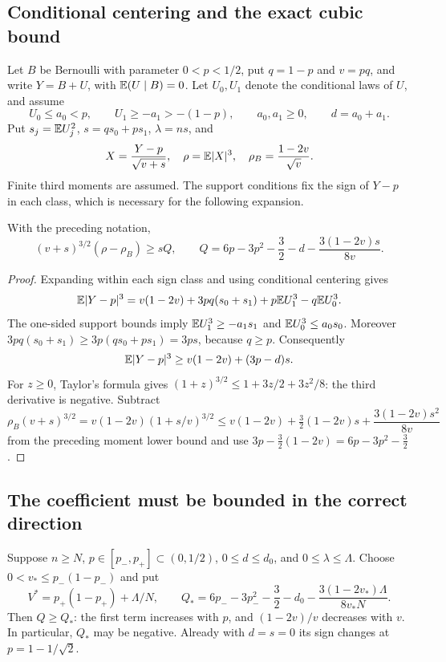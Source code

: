 \subsection{Conditional centering and the exact cubic bound}
Let $B$ be Bernoulli with parameter $0<p<1/2$, put $q=1-p$ and $v=pq$,
and write $Y=B+U$, with $\mathbb E(U\mid B)=0$.
Let $U_0,U_1$ denote the conditional laws of $U$, and assume
\[
 U_0\le a_0<p,\qquad U_1\ge-a_1>-(1-p),\qquad
 a_0,a_1\ge0,\qquad d=a_0+a_1.
\]
Put $s_j=\mathbb E U_j^2$, $s=qs_0+ps_1$, $\lambda=ns$, and
\[
 X=\frac{Y-p}{\sqrt{v+s}},\quad
 \rho=\mathbb E|X|^3,\quad
 \rho_B=\frac{1-2v}{\sqrt v}.
\]
Finite third moments are assumed. The support conditions fix the sign of
$Y-p$ in each class, which is necessary for the following expansion.

\begin{lemma}\label{cubic}
With the preceding notation,
\begin{equation}\label{bracket}
 (v+s)^{3/2}(\rho-\rho_B)\ge sQ,\qquad
 Q=6p-3p^2-\frac32-d-\frac{3(1-2v)s}{8v}.
\end{equation}
\end{lemma}
\begin{proof}
Expanding within each sign class and using conditional centering gives
\[
 \mathbb E|Y-p|^3=v(1-2v)+3pq(s_0+s_1)
                         +p\mathbb E U_1^3-q\mathbb E U_0^3.
\]
The one-sided support bounds imply
$\mathbb E U_1^3\ge-a_1s_1$ and $\mathbb E U_0^3\le a_0s_0$.
Moreover $3pq(s_0+s_1)\ge3p(qs_0+ps_1)=3ps$, because $q\ge p$.
Consequently
\[
                         \mathbb E|Y-p|^3\ge v(1-2v)+(3p-d)s.
\]
For $z\ge0$, Taylor's formula gives
$(1+z)^{3/2}\le1+3z/2+3z^2/8$: the third derivative is negative.
Subtract
\[
 \rho_B(v+s)^{3/2}
 =v(1-2v)(1+s/v)^{3/2}
 \le v(1-2v)+\tfrac32(1-2v)s+\frac{3(1-2v)s^2}{8v}
\]
from the preceding moment lower bound and use
$3p-\tfrac32(1-2v)=6p-3p^2-\tfrac32$.
\end{proof}

\subsection{The coefficient must be bounded in the correct direction}
Suppose $n\ge N$, $p\in[p_-,p_+]\subset(0,1/2)$,
$0\le d\le d_0$, and $0\le\lambda\le\Lambda$.
Choose $0<v_*\le p_-(1-p_-)$ and put
\[
 V^*=p_+(1-p_+)+\Lambda/N,\qquad
 Q_*=6p_--3p_-^2-\frac32-d_0
                     -\frac{3(1-2v_*)\Lambda}{8v_*N}.
\]
Then $Q\ge Q_*$: the first term increases with $p$, and
$(1-2v)/v$ decreases with $v$. In particular, $Q_*$ may be negative.
Already with $d=s=0$ its sign changes at $p=1-1/\sqrt2$.

